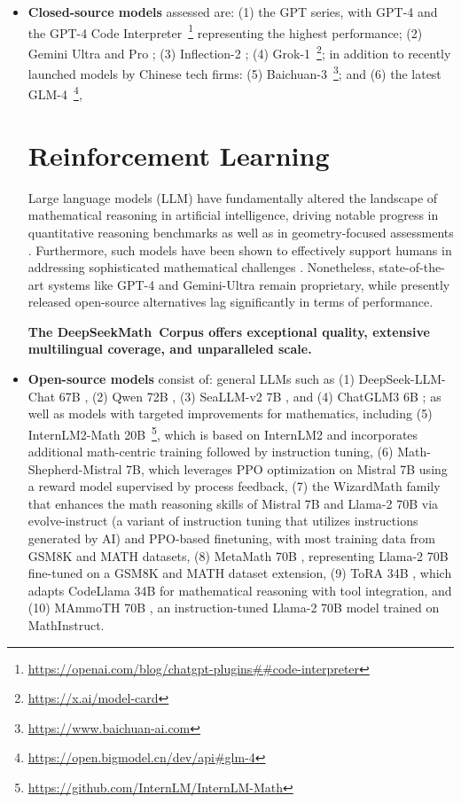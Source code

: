 \begin{itemize}[topsep=0pt]
    \item \textbf{Closed-source models} assessed are: (1) the GPT series, with GPT-4 \citep{gpt4} and the GPT-4 Code Interpreter~\footnote{\url{https://openai.com/blog/chatgpt-plugins\#\#code-interpreter}} representing the highest performance; (2) Gemini Ultra and Pro \citep{gemini}; (3) Inflection-2 \citep{inflection-2}; (4) Grok-1~\footnote{\url{https://x.ai/model-card}}; in addition to recently launched models by Chinese tech firms: (5) Baichuan-3~\footnote{\url{https://www.baichuan-ai.com}}; and (6) the latest GLM-4~\footnote{\url{https://open.bigmodel.cn/dev/api\#glm-4}},

\section{Reinforcement Learning}

Large language models (LLM) have fundamentally altered the landscape of mathematical reasoning in artificial intelligence, driving notable progress in quantitative reasoning benchmarks \citep{MATH} as well as in geometry-focused assessments \citep{trinh2024solving}. Furthermore, such models have been shown to effectively support humans in addressing sophisticated mathematical challenges \citep{tao}. Nonetheless, state-of-the-art systems like GPT-4 \citep{gpt4} and Gemini-Ultra \citep{gemini} remain proprietary, while presently released open-source alternatives lag significantly in terms of performance.

\textbf{The DeepSeekMath~Corpus offers exceptional quality, extensive multilingual coverage, and unparalleled scale.}

\item \textbf{Open-source models} consist of: general LLMs such as (1) DeepSeek-LLM-Chat 67B \citep{deepseek-llm}, (2) Qwen 72B \citep{qwen}, (3) SeaLLM-v2 7B \citep{seallm}, and (4) ChatGLM3 6B \citep{chatglm3}; as well as models with targeted improvements for mathematics, including (5) InternLM2-Math 20B~\footnote{\url{https://github.com/InternLM/InternLM-Math}}, which is based on InternLM2 and incorporates additional math-centric training followed by instruction tuning, (6) Math-Shepherd-Mistral 7B, which leverages PPO optimization \citep{schulman2017proximal} on Mistral 7B \citep{mistral} using a reward model supervised by process feedback, (7) the WizardMath family \citep{wizardmath} that enhances the math reasoning skills of Mistral 7B and Llama-2 70B \citep{llama2} via evolve-instruct (a variant of instruction tuning that utilizes instructions generated by AI) and PPO-based finetuning, with most training data from GSM8K and MATH datasets, (8) MetaMath 70B \citep{metamath}, representing Llama-2 70B fine-tuned on a GSM8K and MATH dataset extension, (9) ToRA 34B \cite{tora}, which adapts CodeLlama 34B for mathematical reasoning with tool integration, and (10) MAmmoTH 70B \citep{MathInstruct}, an instruction-tuned Llama-2 70B model trained on MathInstruct.


\end{itemize}
